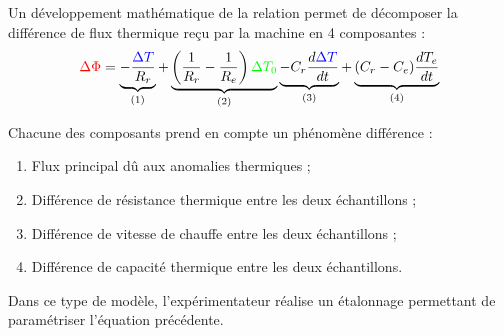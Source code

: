 \documentclass[a4paper]{book}
\begin{document}
Un développement mathématique de la relation permet de décomposer la différence de flux thermique reçu par la machine en 4 composantes : 
\begin{align*}
{\color{red} \Delta \Phi} = \underbrace{- \frac{{\color{blue} \Delta T}}{R_r}}_{(1)} + \underbrace{\left( \frac{1}{R_r} - \frac{1}{R_e} \right) {\color{green} \Delta T_0}}_{(2)} \underbrace{- C_r \frac{d {\color{blue} \Delta T}}{dt}}_{(3)} + \underbrace{(C_r - C_e) \frac{d T_e}{dt}}_{(4)}
\end{align*}

Chacune des composants prend en compte un phénomène différence : 
\begin{enumerate}
\item Flux principal dû aux anomalies thermiques ;
\item Différence de résistance thermique entre les deux échantillons ;
\item Différence de vitesse de chauffe entre les deux échantillons ;
\item Différence de capacité thermique entre les deux échantillons.
\end{enumerate}

Dans ce type de modèle, l'expérimentateur réalise un étalonnage permettant de paramétriser l'équation précédente.
\end{document}
